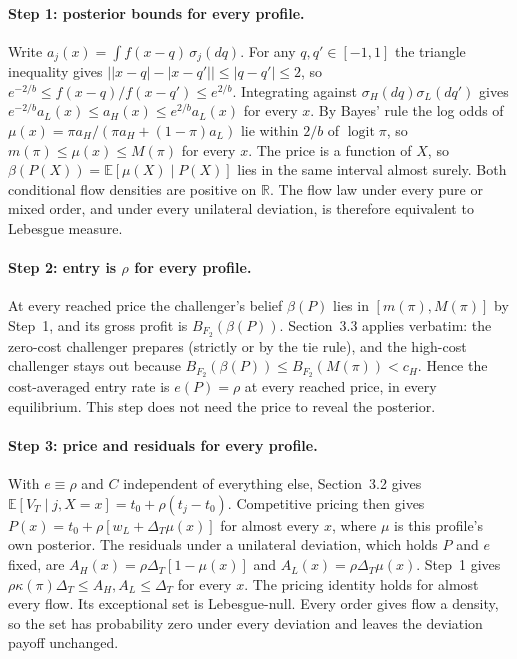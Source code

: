 \documentclass[12pt]{article}
\theoremstyle{remark}
\newcommand{\E}{\mathbb E}
\newcommand{\R}{\mathbb R}
\newcommand{\Dt}{\Delta_T}
\begin{document}
\paragraph{Step 1: posterior bounds for every profile.}
Write $a_j(x)=\int f(x-q)\,\sigma_j(dq)$. For any $q,q'\in[-1,1]$ the triangle inequality gives
$\big||x-q|-|x-q'|\big|\le|q-q'|\le2$, so $e^{-2/b}\le f(x-q)/f(x-q')\le e^{2/b}$. Integrating
against $\sigma_H(dq)\sigma_L(dq')$ gives $e^{-2/b}a_L(x)\le a_H(x)\le e^{2/b}a_L(x)$ for every
$x$. By Bayes' rule the log odds of $\mu(x)=\pi a_H/(\pi a_H+(1-\pi)a_L)$ lie within $2/b$ of
$\operatorname{logit}\pi$, so $m(\pi)\le\mu(x)\le M(\pi)$ for every $x$. The price is a
function of $X$, so $\beta(P(X))=\E[\mu(X)\mid P(X)]$ lies in the same interval almost surely.
Both conditional flow densities are positive on $\R$. The flow law under every pure or mixed
order, and under every unilateral deviation, is therefore equivalent to Lebesgue measure.

\paragraph{Step 2: entry is $\rho$ for every profile.}
At every reached price the challenger's belief $\beta(P)$ lies in $[m(\pi),M(\pi)]$ by Step~1,
and its gross profit is $B_{F_2}(\beta(P))$. Section~3.3 applies verbatim: the zero-cost
challenger prepares (strictly or by the tie rule), and the high-cost challenger stays out
because $B_{F_2}(\beta(P))\le B_{F_2}(M(\pi))<c_H$. Hence the cost-averaged entry rate is
$e(P)=\rho$ at every reached price, in every equilibrium. This step does not need the price to
reveal the posterior.

\paragraph{Step 3: price and residuals for every profile.}
With $e\equiv\rho$ and $C$ independent of everything else, Section~3.2 gives
$\E[V_T\mid j,X=x]=t_0+\rho(t_j-t_0)$. Competitive pricing then gives
$P(x)=t_0+\rho[w_L+\Dt\mu(x)]$ for almost every $x$, where $\mu$ is this profile's own
posterior. The residuals under a unilateral deviation, which holds $P$ and $e$ fixed, are
$A_H(x)=\rho\Dt[1-\mu(x)]$ and $A_L(x)=\rho\Dt\mu(x)$. Step~1 gives
$\rho\kappa(\pi)\Dt\le A_H,A_L\le\Dt$ for every $x$. The pricing identity holds for almost
every flow. Its exceptional set is Lebesgue-null. Every order gives flow a density, so the set has
probability zero under every deviation and leaves the deviation payoff unchanged.
\end{document}
